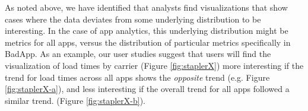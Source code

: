 \begin{example}
As noted above, we have identified that 
analysts find visualizations that show
cases where the data deviates from some underlying distribution to be interesting.
In the case of app analytics, this underlying distribution might be metrics for
all apps, versus the distribution of particular metrics specifically in BadApp.
As an example, our user studies suggest that users will find the visualization of load times by carrier (Figure
\ref{fig:staplerX}) more interesting if the trend for load times across all
apps shows the {\it opposite} trend (e.g. Figure \ref{fig:staplerX-a}), and less interesting if the overall trend for all apps followed a similar trend.
(Figure \ref{fig:staplerX-b}).  
\end{example}



 




